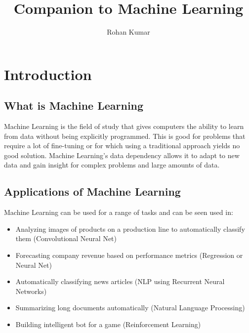 \documentclass[12pt]{article}
\title{Companion to Machine Learning}
\author{Rohan Kumar}
\date{}
\begin{document}
\maketitle
\newpage
\tableofcontents
\newpage

\section*{Introduction}

\subsection{What is Machine Learning}
    Machine Learning is the field of study that gives computers the ability to learn from data without being 
    explicitly programmed. This is good for problems that require a lot of fine-tuning or for which using a 
    traditional approach yields no good solution. Machine Learning's data dependency allows it to adapt to new data
    and gain insight for complex problems and large amounts of data.

\subsection{Applications of Machine Learning}
    Machine Learning can be used for a range of tasks and can be seen used in:
    \begin{itemize}
        \item Analyzing images of products on a production line to automatically classify them (Convolutional Neural Net)
        \item Forecasting company revenue based on performance metrics (Regression or Neural Net)
        \item Automatically classifying news articles (NLP using Recurrent Neural Networks)
        \item Summarizing long documents automatically (Natural Language Processing)
        \item Building intelligent bot for a game (Reinforcement Learning)
    \end{itemize}
\end{document}
